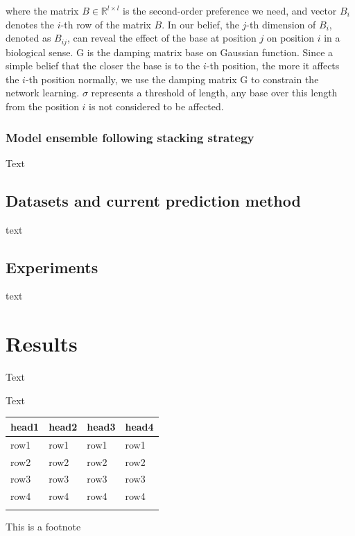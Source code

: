 \documentclass{bioinfo}
\begin{document}
where the matrix $B\in\mathbb{R}^{l\times l}$ is the second-order preference we need, and vector $B_i$ denotes the $i$-th row of the matrix $B$. 
In our belief, the $j$-th dimension of $B_i$, denoted as $B_{ij}$, can reveal the effect of the base at position $j$ on position $i$ in a biological sense. 
G is the damping matrix base on Gaussian function. 
Since a simple belief that the closer the base is to the $i$-th position, the more it affects the $i$-th position normally, we use the damping matrix G to constrain the network learning. 
$\sigma$ represents a threshold of length, any base over this length from the position $i$ is not considered to be affected.
\subsubsection{Model ensemble following stacking strategy}

Text

\subsection{Datasets and current prediction method}

text

\subsection{Experiments}

text

\section{Results}

Text

\enlargethispage{6pt}

Text

\begin{table}[!t]
 {\begin{tabular}{@{}llll@{}}\toprule head1 &
head2 & head3 & head4\\\midrule
row1 & row1 & row1 & row1\\
row2 & row2 & row2 & row2\\
row3 & row3 & row3 & row3\\
row4 & row4 & row4 & row4\\\botrule
\end{tabular}}{This is a footnote}
\end{table}
\end{document}
